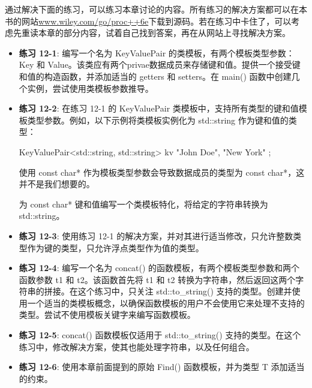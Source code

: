 通过解决下面的练习，可以练习本章讨论的内容。所有练习的解决方案都可以在本书的网站\url{www.wiley.com/go/proc++6e}下载到源码。若在练习中卡住了，可以考虑先重读本章的部分内容，试着自己找到答案，再在从网站上寻找解决方案。

\begin{itemize}
\item
\textbf{练习 12-1}: 编写一个名为 KeyValuePair 的类模板，有两个模板类型参数：Key 和 Value。该类应有两个privae数据成员来存储键和值。提供一个接受键和值的构造函数，并添加适当的 getters 和 setters。在 main() 函数中创建几个实例，尝试使用类模板参数推导。

\item
\textbf{练习 12-2}: 在练习 12-1 的 KeyValuePair 类模板中，支持所有类型的键和值模板类型参数。例如，以下示例将类模板实例化为 std::string 作为键和值的类型：

\begin{cpp}
KeyValuePair<std::string, std::string> kv { "John Doe", "New York" };
\end{cpp}

使用 const char* 作为模板类型参数会导致数据成员的类型为 const char*，这并不是我们想要的。

为 const char* 键和值编写一个类模板特化，将给定的字符串转换为 std::string。

\item
\textbf{练习 12-3}: 使用练习 12-1 的解决方案，并对其进行适当修改，只允许整数类型作为键的类型，只允许浮点类型作为值的类型。

\item
\textbf{练习 12-4}: 编写一个名为 concat() 的函数模板，有两个模板类型参数和两个函数参数 t1 和 t2。该函数首先将 t1 和 t2 转换为字符串，然后返回这两个字符串的拼接。在这个练习中，只关注 std::to\_string() 支持的类型。创建并使用一个适当的类模板概念，以确保函数模板的用户不会使用它来处理不支持的类型。尝试不使用模板关键字来编写函数模板。

\item
\textbf{练习 12-5}: concat() 函数模板仅适用于 std::to\_string() 支持的类型。在这个练习中，修改解决方案，使其也能处理字符串，以及任何组合。

\item
\textbf{练习 12-6}: 使用本章前面提到的原始 Find() 函数模板，并为类型 T 添加适当的约束。
\end{itemize}